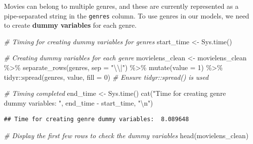 \documentclass[
]{article}
\newenvironment{Shaded}{}{}
\newcommand{\AttributeTok}[1]{\textcolor[rgb]{0.49,0.56,0.16}{#1}}
\newcommand{\CommentTok}[1]{\textcolor[rgb]{0.38,0.63,0.69}{\textit{#1}}}
\newcommand{\DecValTok}[1]{\textcolor[rgb]{0.25,0.63,0.44}{#1}}
\newcommand{\FunctionTok}[1]{\textcolor[rgb]{0.02,0.16,0.49}{#1}}
\newcommand{\NormalTok}[1]{#1}
\newcommand{\OtherTok}[1]{\textcolor[rgb]{0.00,0.44,0.13}{#1}}
\newcommand{\SpecialCharTok}[1]{\textcolor[rgb]{0.25,0.44,0.63}{#1}}
\newcommand{\StringTok}[1]{\textcolor[rgb]{0.25,0.44,0.63}{#1}}
\begin{document}
Movies can belong to multiple genres, and these are currently
represented as a pipe-separated string in the \texttt{genres} column. To
use genres in our models, we need to create \textbf{dummy variables} for
each genre.

\begin{Shaded}
\begin{Highlighting}[]
\CommentTok{\# Timing for creating dummy variables for genres}
\NormalTok{start\_time }\OtherTok{\textless{}{-}} \FunctionTok{Sys.time}\NormalTok{()}

\CommentTok{\# Creating dummy variables for each genre}
\NormalTok{movielens\_clean }\OtherTok{\textless{}{-}}\NormalTok{ movielens\_clean }\SpecialCharTok{\%\textgreater{}\%}
  \FunctionTok{separate\_rows}\NormalTok{(genres, }\AttributeTok{sep =} \StringTok{"}\SpecialCharTok{\textbackslash{}\textbackslash{}}\StringTok{|"}\NormalTok{) }\SpecialCharTok{\%\textgreater{}\%}
  \FunctionTok{mutate}\NormalTok{(}\AttributeTok{value =} \DecValTok{1}\NormalTok{) }\SpecialCharTok{\%\textgreater{}\%}
\NormalTok{  tidyr}\SpecialCharTok{::}\FunctionTok{spread}\NormalTok{(genres, value, }\AttributeTok{fill =} \DecValTok{0}\NormalTok{)  }\CommentTok{\# Ensure tidyr::spread() is used}

\CommentTok{\# Timing completed}
\NormalTok{end\_time }\OtherTok{\textless{}{-}} \FunctionTok{Sys.time}\NormalTok{()}
\FunctionTok{cat}\NormalTok{(}\StringTok{"Time for creating genre dummy variables: "}\NormalTok{, end\_time }\SpecialCharTok{{-}}\NormalTok{ start\_time, }\StringTok{"}\SpecialCharTok{\textbackslash{}n}\StringTok{"}\NormalTok{)}
\end{Highlighting}
\end{Shaded}

\begin{verbatim}
## Time for creating genre dummy variables:  8.089648
\end{verbatim}

\begin{Shaded}
\begin{Highlighting}[]
\CommentTok{\# Display the first few rows to check the dummy variables}
\FunctionTok{head}\NormalTok{(movielens\_clean)}
\end{Highlighting}
\end{Shaded}
\end{document}
